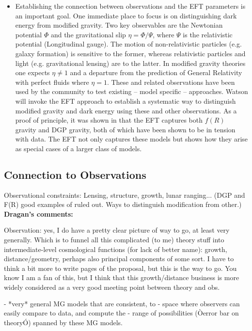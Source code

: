 \documentclass[useAMS,12pt]{article}
\begin{document}
\begin{itemize}
\item Establishing the connection between observations and the EFT parameters is an important goal.  One immediate place to focus is on distinguishing dark energy from modified gravity.  Two key observables are the Newtonian potential $\Phi$ and the gravitational slip $\eta=\Phi / \Psi$, where $\Psi$ is the relativistic potential (Longitudinal gauge).  The motion of non-relativistic particles (e.g.  galaxy formation) is sensitive to the former, whereas relativistic particles and light (e.g. gravitational lensing) are to the latter.  In modified gravity theories one expects $\eta \neq 1$ and a departure from the prediction of General Relativity with perfect fluids where $\eta=1$.  These and related observations have been used by the community to test existing -- model specific -- approaches. Watson will invoke the EFT approach to establish a systematic way to distinguish modified gravity and dark energy using these and other observations.  As a proof of principle, it was shown in \cite{Gubitosi:2012hu,Bloomfield:2012ff} that the EFT captures both $f(R)$ gravity and DGP gravity, both of which have been shown to be in tension with data.  The EFT not only captures these models but shows how they arise as special cases of a larger class of models.
\end{itemize}


 
\subsection{Connection to Observations} 
Observational constraints:  Lensing, structure, growth, lunar ranging... (DGP and F(R) good examples of ruled out.  Ways to distinguish modification from other.)
\\

{\bf Dragan's comments:}

Observation: yes, I do have a pretty clear picture of way to go, at least very generally. Which is to funnel all this complicated (to me) theory stuff into intermediate-level cosmological functions (for lack of better name): growth, distance/geometry, perhaps also principal components of some sort. I have to think a bit more to write pages of the proposal, but this is the way to go. You know I am a fan of this, but I think that this growth/distance business is more widely considered as a very good meeting point between theory and obs. 

- *very* general MG models that are consistent, to
- space where observers can easily compare to data, and compute the 
- range of possibilities (Òerror bar on theoryÓ) spanned by these MG models. 
\end{document}
